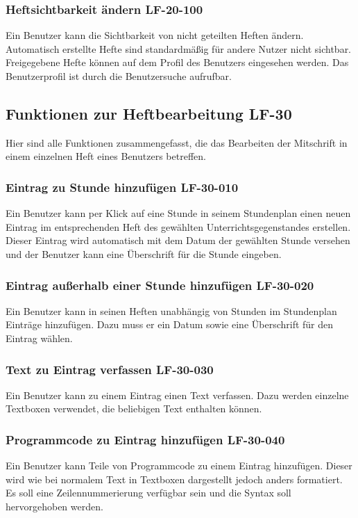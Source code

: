 \documentclass[12pt,a4paper,oneside,ngerman]{scrartcl}
\begin{document}
\subsubsection{Heftsichtbarkeit ändern \hfill LF-20-100}
Ein Benutzer kann die Sichtbarkeit von nicht geteilten Heften ändern. Automatisch erstellte Hefte sind standardmäßig für andere Nutzer nicht sichtbar. Freigegebene Hefte können auf dem Profil des Benutzers eingesehen werden. Das Benutzerprofil ist durch die Benutzersuche aufrufbar.

\subsection[Funktionen zur Heftbearbeitung]{Funktionen zur Heftbearbeitung \hfill LF-30}
Hier sind alle Funktionen zusammengefasst, die das Bearbeiten der Mitschrift in einem einzelnen Heft eines Benutzers betreffen.

\subsubsection{Eintrag zu Stunde hinzufügen \hfill LF-30-010}
Ein Benutzer kann per Klick auf eine Stunde in seinem Stundenplan einen neuen Eintrag im entsprechenden Heft des gewählten Unterrichtsgegenstandes erstellen. Dieser Eintrag wird automatisch mit dem Datum der gewählten Stunde versehen und der Benutzer kann eine Überschrift für die Stunde eingeben.

\subsubsection{Eintrag außerhalb einer Stunde hinzufügen \hfill LF-30-020}
Ein Benutzer kann in seinen Heften unabhängig von Stunden im Stundenplan  Einträge hinzufügen. Dazu muss er ein Datum sowie eine Überschrift für den Eintrag wählen.

\subsubsection{Text zu Eintrag verfassen \hfill LF-30-030}
Ein Benutzer kann zu einem Eintrag einen Text verfassen. Dazu werden einzelne Textboxen verwendet, die beliebigen Text enthalten können.

\subsubsection{Programmcode zu Eintrag hinzufügen \hfill LF-30-040}
Ein Benutzer kann Teile von Programmcode zu einem Eintrag hinzufügen. Dieser wird wie bei normalem Text in Textboxen dargestellt jedoch anders formatiert. Es soll eine Zeilennummerierung verfügbar sein und die Syntax soll hervorgehoben werden.
\end{document}
